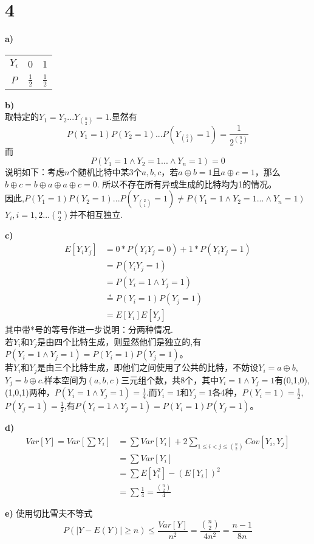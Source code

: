 \documentclass[a4paper,twocolumn]{ctexart}
\begin{document}
\section*{4}
\noindent \textbf{a)}
\begin{center}
	\begin{tabular}{ccc}
		\hline
		\hline
		$Y_i$&0&1\\
		$P$&$\frac{1}{2}$&$\frac{1}{2}$\\
		\hline
	\end{tabular}
\end{center}
\noindent\textbf{ b)}\\
取特定的$Y_1=Y_2...Y_{\binom{n}{2}}=1$.显然有
\[
P(Y_1=1)P(Y_2=1)...P(Y_{\binom{2}{1}}=1)=\frac{1}{2^{\binom{n}{2}}}
\]
而
\[
P(Y_1=1\wedge Y_2=1 ...\wedge Y_n=1)=0
\]
说明如下：考虑$n$个随机比特中某3个$a,b,c$，若$a\oplus b=1$且$a\oplus c=1$，那么$b\oplus c=b\oplus a \oplus a \oplus c=0$.
所以不存在所有异或生成的比特均为1的情况。\\
因此,$
P(Y_1=1)P(Y_2=1)...P(Y_{\binom{2}{1}}=1)\neq P(Y_1=1\wedge Y_2=1 ...\wedge Y_n=1)
$\\
$Y_i,i=1,2...\binom{n}{2}$并不相互独立.

\noindent \textbf{c)}
\begin{align*}
E[Y_iY_j]&=0*P(Y_iY_j=0)+1*P(Y_iY_j=1)\\
&=P(Y_iY_j=1)\\
&=P(Y_i=1\wedge Y_j=1)\\
&\overset{*}{=}P(Y_i=1)P(Y_j=1)\\
&=E[Y_i]E[Y_j]
\end{align*}
其中带*号的等号作进一步说明：分两种情况.\\
若$Y_i$和$Y_j$是由四个比特生成，则显然他们是独立的,有$P(Y_i=1\wedge Y_j=1)=P(Y_i=1)P(Y_j=1)$。\\
若$Y_i$和$Y_j$是由三个比特生成，即他们之间使用了公共的比特，不妨设$Y_i=a\oplus b$,$Y_j=b\oplus c$.样本空间为$(a,b,c)$三元组个数，共8个，其中$Y_i=1\wedge Y_j=1$有{(0,1,0),(1,0,1)}两种，$P(Y_i=1\wedge Y_j=1)=\frac{1}{4}$.而$Y_i=1$和$Y_j=1$各4种，$P(Y_i=1)=\frac{1}{2}$,$P(Y_j=1)=\frac{1}{2}$,有$P(Y_i=1\wedge Y_j=1)=P(Y_i=1)P(Y_j=1)$。

\noindent \textbf{d)}
\begin{align*}
Var[Y]=Var[\sum Y_i]&=\sum Var[Y_i]+2\sum_{1\le i<j\le \binom{n}{2}}Cov[Y_i,Y_j]\\
&=\sum Var[Y_i]\\
&=\sum E[Y_i^2]-(E[Y_i])^2\\
&=\sum \frac{1}{4}=\frac{\binom{n}{2}}{4}
\end{align*}

\noindent\textbf{e)}
使用切比雪夫不等式
\[
P(|Y-E(Y)|\ge n)\le \frac{Var[Y]}{n^2}=\frac{\binom{n}{2}}{4n^2}=\frac{n-1}{8n}
\]
\end{document}
